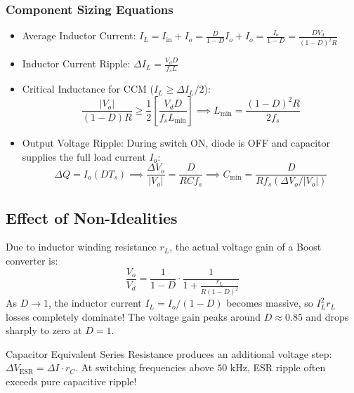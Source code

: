 \documentclass[11pt,a4paper]{article}
\renewcommand{\boxed}[1]{#1}
\begin{document}
\subsubsection{Component Sizing Equations}
\begin{itemize}[leftmargin=*]
  \item Average Inductor Current: $I_L = I_{\text{in}} + I_o = \frac{D}{1 - D} I_o + I_o = \boxed{\frac{I_o}{1 - D} = \frac{D V_d}{(1 - D)^2 R}}$
  \item Inductor Current Ripple: $\Delta I_L = \frac{V_d D}{f_s L}$
  \item Critical Inductance for CCM ($I_L \ge \Delta I_L / 2$):
  \[
  \frac{|V_o|}{(1 - D) R} \ge \frac{1}{2} \left[ \frac{V_d D}{f_s L_{\min}} \right] \implies \boxed{L_{\min} = \frac{(1 - D)^2 R}{2 f_s}}
  \]
  \item Output Voltage Ripple: During switch ON, diode is OFF and capacitor supplies the full load current $I_o$:
  \[
  \Delta Q = I_o (D T_s) \implies \boxed{\frac{\Delta V_o}{|V_o|} = \frac{D}{R C f_s} \implies C_{\min} = \frac{D}{R f_s (\Delta V_o / |V_o|)}}
  \]
\end{itemize}

\subsection{Effect of Non-Idealities}
\begin{alertbox}
Due to inductor winding resistance $r_L$, the actual voltage gain of a Boost converter is:
\[
\boxed{\frac{V_o}{V_d} = \frac{1}{1 - D} \cdot \frac{1}{1 + \frac{r_L}{R (1 - D)^2}}}
\]
As $D \to 1$, the inductor current $I_L = I_o / (1-D)$ becomes massive, so $I_L^2 r_L$ losses completely dominate! The voltage gain peaks around $D \approx 0.85$ and drops sharply to zero at $D = 1$.
\end{alertbox}

\begin{alertbox}
Capacitor Equivalent Series Resistance produces an additional voltage step: $\Delta V_{\text{ESR}} = \Delta I \cdot r_C$. At switching frequencies above $50\text{ kHz}$, ESR ripple often exceeds pure capacitive ripple!
\end{alertbox}
\end{document}
